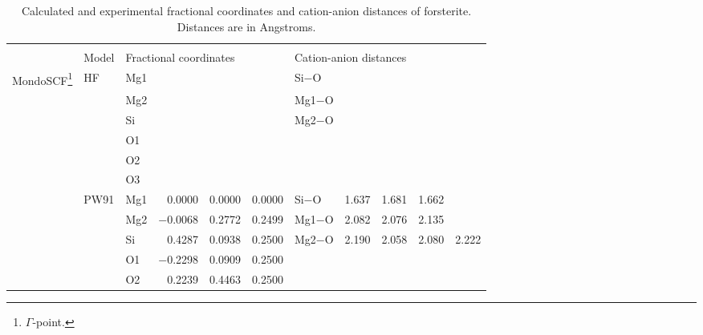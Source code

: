 \documentclass[pra,twocolumn,twocolumngrid,superbib]{revtex4} %
\begin{document}
\begin{table}[t]
  \centering
  \caption{\protect
    Calculated and experimental fractional coordinates and cation-anion distances of forsterite.
    Distances are in Angstroms.
  }\label{Tab:FracCoords}
  \begin{tabular}{lllrrrlcccc}
  \toprule
  &  &  &  &  &  &  &  &  &  & \\
  & Model & \multicolumn{4}{l}{Fractional coordinates} & \multicolumn{5}{l}{Cation-anion distances} \\
  \hline
    {\sc MondoSCF}\footnote[1]{$\Gamma$-point.}
    & HF     & Mg1 &  &  &  & Si$-$O  &       &       &       & \\%
    &        & Mg2 &  &  &  & Mg1$-$O &       &       &       & \\%
    &        & Si  &  &  &  & Mg2$-$O &       &       &       & \\%
    &        & O1  &  &  &  &         &       &       &       & \\%
    &        & O2  &  &  &  &         &       &       &       & \\%
    &        & O3  &  &  &  &         &       &       &       & \\%
    & PW91   & Mg1 &     0.0000 & 0.0000 & 0.0000 & Si$-$O  & 1.637 & 1.681 & 1.662 & \\%
    &        & Mg2 &  $-$0.0068 & 0.2772 & 0.2499 & Mg1$-$O & 2.082 & 2.076 & 2.135 & \\%
    &        & Si  &     0.4287 & 0.0938 & 0.2500 & Mg2$-$O & 2.190 & 2.058 & 2.080 & 2.222 \\%
    &        & O1  &  $-$0.2298 & 0.0909 & 0.2500 &         &       &       &       & \\%
    &        & O2  &     0.2239 & 0.4463 & 0.2500 &         &       &       &       & \\%

\end{tabular}
\end{table}
\end{document}
